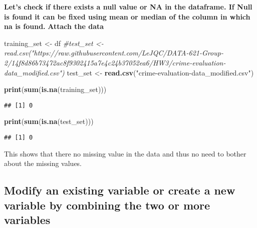 \documentclass[
]{article}
\newenvironment{Shaded}{\begin{snugshade}}{\end{snugshade}}
\newcommand{\CommentTok}[1]{\textcolor[rgb]{0.56,0.35,0.01}{\textit{#1}}}
\newcommand{\FunctionTok}[1]{\textcolor[rgb]{0.13,0.29,0.53}{\textbf{#1}}}
\newcommand{\NormalTok}[1]{#1}
\newcommand{\OtherTok}[1]{\textcolor[rgb]{0.56,0.35,0.01}{#1}}
\newcommand{\StringTok}[1]{\textcolor[rgb]{0.31,0.60,0.02}{#1}}
\begin{document}
\textbf{Let's check if there exists a null value or NA in the dataframe.
If Null is found it can be fixed using mean or median of the column in
which na is found.} \textbf{Attach the data}

\begin{Shaded}
\begin{Highlighting}[]
\NormalTok{training\_set }\OtherTok{\textless{}{-}}\NormalTok{ df}
\CommentTok{\#test\_set \textless{}{-} read.csv("https://raw.githubusercontent.com/LeJQC/DATA{-}621{-}Group{-}2/14f8d86b73472ac8f9302415a7e4c24b37052ea6/HW3/crime{-}evaluation{-}data\_modified.csv")}
\NormalTok{test\_set }\OtherTok{\textless{}{-}} \FunctionTok{read.csv}\NormalTok{(}\StringTok{"crime{-}evaluation{-}data\_modified.csv"}\NormalTok{)}
\end{Highlighting}
\end{Shaded}

\begin{Shaded}
\begin{Highlighting}[]
\FunctionTok{print}\NormalTok{(}\FunctionTok{sum}\NormalTok{(}\FunctionTok{is.na}\NormalTok{(training\_set)))}
\end{Highlighting}
\end{Shaded}

\begin{verbatim}
## [1] 0
\end{verbatim}

\begin{Shaded}
\begin{Highlighting}[]
\FunctionTok{print}\NormalTok{(}\FunctionTok{sum}\NormalTok{(}\FunctionTok{is.na}\NormalTok{(test\_set)))}
\end{Highlighting}
\end{Shaded}

\begin{verbatim}
## [1] 0
\end{verbatim}

This shows that there no missing value in the data and thus no need to
bother about the missing values.

\hypertarget{modify-an-existing-variable-or-create-a-new-variable-by-combining-the-two-or-more-variables}{%
\subsection{Modify an existing variable or create a new variable by
combining the two or more
variables}\label{modify-an-existing-variable-or-create-a-new-variable-by-combining-the-two-or-more-variables}}
\end{document}
